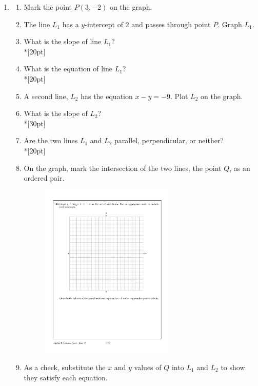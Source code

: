 \documentclass[]{book}
\begin{document}
\begin{enumerate}
\newpage
\item  
\begin{enumerate}
    \item Mark the point $P(3, -2)$ on the graph.
    \item The line $L_1$ has a $y$-intercept of 2 and passes through point $P$. Graph $L_1$.
    \item What is the slope of line $L_1$?\\*[20pt]
    \item What is the equation of line $L_1$?\\*[20pt]
    \item A second line, $L_2$ has the equation $x-y=-9$. Plot $L_2$ on the graph.
    \item What is the slope of $L_2$?\\*[30pt]
    \item Are the two lines $L_1$ and $L_2$ parallel, perpendicular, or neither?\\*[20pt]
    \item On the graph, mark the intersection of the two lines, the point $Q$, as an ordered pair.


\begin{figure}[!ht]
    \centering
    \includegraphics[width=0.65\textwidth]{regents-grid.pdf}
\end{figure}

    \item As a check, substitute the $x$ and $y$ values of $Q$ into $L_1$ and $L_2$ to show they satisfy each equation.


\end{enumerate}
\end{enumerate}
\end{document}
